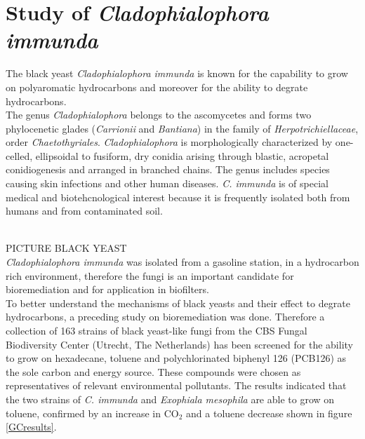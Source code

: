 \documentclass[12pt, a4paper]{report}
\begin{document}
\section{Study of \textit{Cladophialophora immunda}}
The black yeast \textit{Cladophialophora immunda} is known for the capability to grow on polyaromatic hydrocarbons and moreover for the ability to degrate hydrocarbons.\\
The genus \textit{Cladophialophora} belongs to the ascomycetes and forms two phylocenetic glades (\textit{Carrionii} and \textit{Bantiana}) in the family of \textit{Herpotrichiellaceae}, order \textit{Chaetothyriales}. \textit{Cladophialophora} is morphologically characterized by one-celled, ellipsoidal to fusiform, dry conidia arising through blastic, acropetal conidiogenesis and arranged in branched chains. The genus includes species causing skin infections and other human diseases. \textit{C. immunda} is of special medical and biotehcnological interest because it is frequently isolated both from humans and from contaminated soil. \cite{Sterflinger2015, Badali2008}
 
 \ \\
 PICTURE BLACK YEAST
 \ \\
 
 
\textit{Cladophialophora immunda} was isolated from a gasoline station, in a hydrocarbon rich environment, therefore the fungi is an important candidate for bioremediation and for application in biofilters. \cite{Prenafeta-Boldu2001} \\
To better understand the mechanisms of black yeasts and their effect to degrate hydrocarbons, a preceding study on bioremediation was done. Therefore a collection of 163 strains of black yeast-like fungi from the CBS Fungal Biodiversity Center (Utrecht, The Netherlands) has been screened for the ability to grow on hexadecane, toluene and polychlorinated biphenyl 126 (PCB126) as the sole carbon and energy source. These compounds were chosen as representatives of relevant environmental pollutants. 
The results indicated that the two strains of \textit{C. immunda} and \textit{Exophiala mesophila} are able to grow on toluene, confirmed by an increase in CO$_2$ and a toluene decrease shown in figure \ref{GCresults}.\cite{BarbaraBlasi2015, Poyntner2014}
\end{document}
